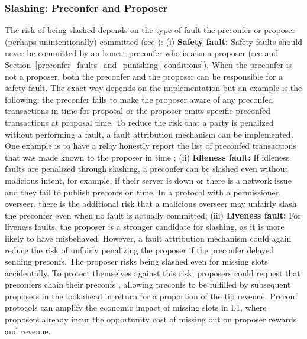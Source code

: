 \documentclass[a4paper]{article}
\theoremstyle{boldstyle}
\begin{document}
    \subsubsection{Slashing: Preconfer and Proposer}
    \label{risk_slashing:preconfer}
        The risk of being slashed depends on the type of fault the preconfer or proposer (perhaps unintentionally) committed (see \cite{W:Basedpreconfirmations}): (i) \textbf{Safety fault:} Safety faults should never be committed by an honest preconfer who is also a proposer (see \cite{W:Basedpreconfirmations} and Section~\ref{preconfer_faults_and_punishing_conditions}). 
        When the preconfer is not a proposer, both the preconfer and the proposer can be responsible for a safety fault. The exact way depends on the implementation but an example is the following:
        the preconfer fails to make the proposer aware of any preconfed transactions in time for proposal or the proposer omits specific preconfed transactions at proposal time. To reduce the risk that a party is penalized without performing a fault, a fault attribution mechanism can be implemented. One example is to have a relay honestly report the list of preconfed transactions that was made known to the proposer in time \cite{W:FaultAttribution}; (ii) \textbf{Idleness fault:} If idleness faults are penalized through slashing, a preconfer can be slashed even without malicious intent, for example, if their server is down or there is a network issue and they fail to publish preconfs on time. In a protocol with a permissioned overseer, there is the additional risk that a malicious overseer may unfairly slash the preconfer even when no fault is actually committed; (iii) \textbf{Liveness fault:} For liveness faults, the proposer is a stronger candidate for slashing, as it is more likely to have misbehaved. However, a fault attribution mechanism could again reduce the risk of unfairly penalizing the proposer if the preconfer delayed sending preconfs. 
                The proposer risks being slashed even for missing slots accidentally. To protect themselves against this risk, proposers could request that preconfers chain their preconfs \cite{W:AvoidingAccidentalLivenessFaultsforBasedPreconfs}, allowing preconfs to be fulfilled by subsequent proposers in the lookahead in return for a proportion of the tip revenue. Preconf protocols can amplify the economic impact of missing slots in L1, where proposers already incur the opportunity cost of missing out on proposer rewards and revenue.
\end{document}
